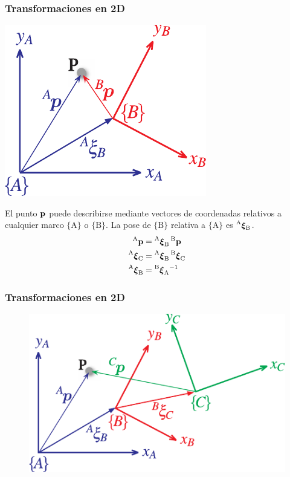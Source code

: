 \begin{frame}
    \frametitle{Transformaciones en 2D}
    \small
    \begin{center}
        \includegraphics[width=0.3\columnwidth]{./images/coordinate_frames.pdf}
    \end{center}
    
    
    El punto $\point$ puede describirse mediante vectores de coordenadas relativos a cualquier marco $\{\mathrm{A}\}$ o $\{\mathrm{B}\}$. La pose de $\{\mathrm{B}\}$ relativa a $\{\mathrm{A}\}$ es $\transform{A}{B}$.
    \begin{align*}
        \pointCoord{A} &= \transform{A}{B}\pointCoord{B}\\
        \transform{A}{C} &= \transform{A}{B}\transform{B}{C}\\
        \transform{A}{B} &= \transform{B}{A}^{-1}
    \end{align*}
    
\end{frame}


\begin{frame}
    \frametitle{Transformaciones en 2D}
    
    \begin{figure}[!h]
        \includegraphics[width=0.6\columnwidth]{./images/multiple_coordinate_frames_2d.pdf}
    \end{figure}
    
\end{frame}


